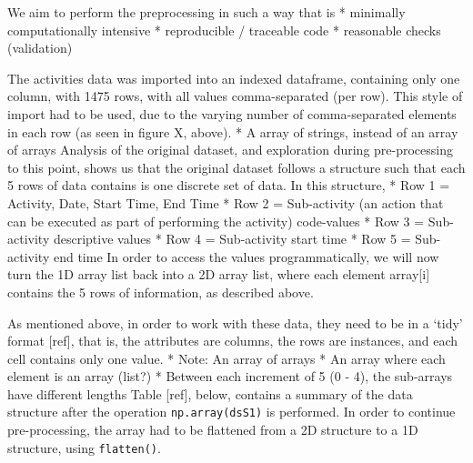 \documentclass[11pt,]{article}
\begin{document}
We aim to perform the preprocessing in such a way that is * minimally
computationally intensive * reproducible / traceable code * reasonable
checks (validation)

The activities data was imported into an indexed dataframe, containing
only one column, with 1475 rows, with all values comma-separated (per
row). This style of import had to be used, due to the varying number of
comma-separated elements in each row (as seen in figure X, above). * A
array of strings, instead of an array of arrays Analysis of the original
dataset, and exploration during pre-processing to this point, shows us
that the original dataset follows a structure such that each 5 rows of
data contains is one discrete set of data. In this structure, * Row 1 =
Activity, Date, Start Time, End Time * Row 2 = Sub-activity (an action
that can be executed as part of performing the activity) code-values *
Row 3 = Sub-activity descriptive values * Row 4 = Sub-activity start
time * Row 5 = Sub-activity end time In order to access the values
programmatically, we will now turn the 1D array list back into a 2D
array list, where each element array{[}i{]} contains the 5 rows of
information, as described above.

\begin{table}[!h]

\caption{\label{tab:TAB_processingExample}Demo table}
\centering
{}
\end{table}

As mentioned above, in order to work with these data, they need to be in
a `tidy' format {[}ref{]}, that is, the attributes are columns, the rows
are instances, and each cell contains only one value. * Note: An array
of arrays * An array where each element is an array (list?) * Between
each increment of 5 (0 - 4), the sub-arrays have different lengths Table
{[}ref{]}, below, contains a summary of the data structure after the
operation \texttt{np.array(dsS1)} is performed. In order to continue
pre-processing, the array had to be flattened from a 2D structure to a
1D structure, using \texttt{flatten()}.
\end{document}
